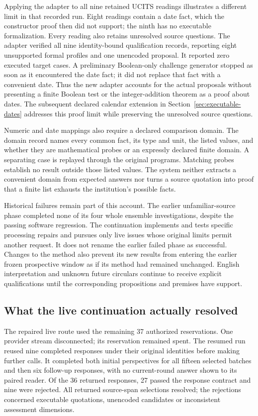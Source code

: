 \documentclass[12pt,a4paper,oneside,openany]{book}
\begin{document}
Applying the adapter to all nine retained UCITS readings illustrates a different
limit in that recorded run. Eight readings contain a date fact, which the
constructor proof then did not support; the ninth has no executable formalization. Every reading also
retains unresolved source questions. The adapter verified all nine identity-bound
qualification records, reporting eight unsupported formal profiles and one
unencoded proposal. It reported zero executed target cases. A preliminary
Boolean-only challenge generator stopped as soon as it encountered the date
fact; it did not replace that fact with a convenient date. Thus the new adapter
accounts for the actual proposals without presenting a finite Boolean test or
the integer-addition theorem as a proof about dates. The subsequent declared
calendar extension in Section~\ref{sec:executable-dates} addresses this proof
limit while preserving the unresolved source questions.

Numeric and date mappings also require a declared comparison domain. The
domain record names every common fact, its type and unit, the listed values,
and whether they are mathematical probes or an expressly declared finite
domain. A separating case is replayed through the original programs. Matching
probes establish no result outside those listed values. The system neither
extracts a convenient domain from expected answers nor turns a source quotation
into proof that a finite list exhausts the institution's possible facts.

Historical failures remain part of this account. The earlier unfamiliar-source
phase completed none of its four whole ensemble investigations, despite the
passing software regression. The continuation implements and tests specific
processing repairs and pursues only live issues whose original limits permit
another request. It does not rename the earlier failed phase as successful.
Changes to the method also prevent its new results from entering the earlier
frozen prospective window as if its method had remained unchanged. English
interpretation and unknown future circulars continue to receive explicit
qualifications until the corresponding propositions and premises have support.

\subsection{What the live continuation actually resolved}

The repaired live route used the remaining 37 authorized reservations. One
provider stream disconnected; its reservation remained spent. The resumed run
reused nine completed responses under their original identities before making
further calls. It completed both initial perspectives for all fifteen selected
batches and then six follow-up responses, with no current-round answer shown
to its paired reader. Of the 36 returned responses, 27 passed the response
contract and nine were rejected. All returned source-span selections resolved;
the rejections concerned executable quotations, unencoded candidates or
inconsistent assessment dimensions.
\end{document}
